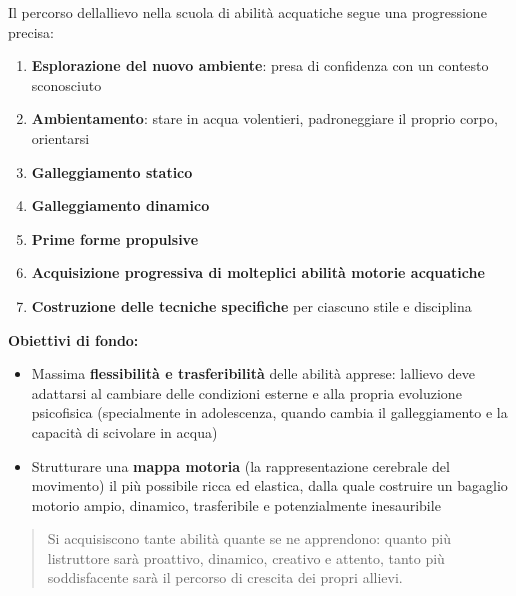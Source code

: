 \documentclass[a4paper,11pt]{article}
\providecommand{\tightlist}{%
  \setlength{\itemsep}{0pt}\setlength{\parskip}{0pt}}
\begin{document}
Il percorso dell\textquotesingle allievo nella scuola di abilità
acquatiche segue una progressione precisa:

\begin{enumerate}
      \tightlist
      \item
            \textbf{Esplorazione del nuovo ambiente}: presa di confidenza con un
            contesto sconosciuto
      \item
            \textbf{Ambientamento}: stare in acqua volentieri, padroneggiare il
            proprio corpo, orientarsi
      \item
            \textbf{Galleggiamento statico}
      \item
            \textbf{Galleggiamento dinamico}
      \item
            \textbf{Prime forme propulsive}
      \item
            \textbf{Acquisizione progressiva di molteplici abilità motorie
                  acquatiche}
      \item
            \textbf{Costruzione delle tecniche specifiche} per ciascuno stile e
            disciplina
\end{enumerate}

\textbf{Obiettivi di fondo:}

\begin{itemize}
      \tightlist
      \item
            Massima \textbf{flessibilità e trasferibilità} delle abilità apprese:
            l\textquotesingle allievo deve adattarsi al cambiare delle condizioni
            esterne e alla propria evoluzione psicofisica (specialmente in
            adolescenza, quando cambia il galleggiamento e la capacità di
            scivolare in acqua)
      \item
            Strutturare una \textbf{mappa motoria} (la rappresentazione cerebrale
            del movimento) il più possibile ricca ed elastica, dalla quale
            costruire un bagaglio motorio ampio, dinamico, trasferibile e
            potenzialmente inesauribile
\end{itemize}

\begin{quote}
      Si acquisiscono tante abilità quante se ne apprendono: quanto più
      l\textquotesingle istruttore sarà proattivo, dinamico, creativo e
      attento, tanto più soddisfacente sarà il percorso di crescita dei propri
      allievi.
\end{quote}
\end{document}
